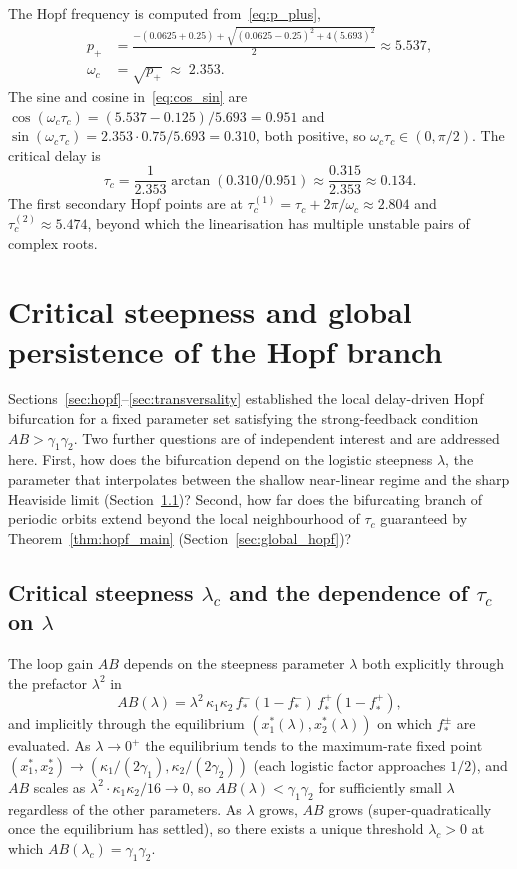 \documentclass[sn-mathphys,Numbered]{sn-jnl}
\theoremstyle{thmstyleone}
\theoremstyle{thmstyletwo}
\theoremstyle{thmstylethree}
\begin{document}
The Hopf frequency is computed from~\eqref{eq:p_plus},
\begin{align*}
p_+ &= \frac{-(0.0625+0.25)+\sqrt{(0.0625-0.25)^2+4(5.693)^2}}{2}
\approx 5.537,\\
\omega_c &= \sqrt{p_+}\;\approx\; 2.353.
\end{align*}
The sine and cosine in~\eqref{eq:cos_sin} are
$\cos(\omega_c\tau_c) = (5.537-0.125)/5.693 = 0.951$ and
$\sin(\omega_c\tau_c) = 2.353\cdot 0.75/5.693 = 0.310$, both positive, so
$\omega_c\tau_c\in(0,\pi/2)$. The critical delay is
\[
\tau_c
= \frac{1}{2.353}\arctan(0.310/0.951)\approx \frac{0.315}{2.353} \approx 0.134.
\]
The first secondary Hopf points are at
$\tau_c^{(1)} = \tau_c+2\pi/\omega_c\approx 2.804$ and
$\tau_c^{(2)}\approx 5.474$, beyond which the linearisation has multiple
unstable pairs of complex roots.

\section{Critical steepness and global persistence of the Hopf branch}
\label{sec:param_global}

Sections~\ref{sec:hopf}--\ref{sec:transversality} established the
local delay-driven Hopf bifurcation for a fixed parameter set
satisfying the strong-feedback condition $AB>\gamma_1\gamma_2$. Two
further questions are of independent interest and are addressed here.
First, how does the bifurcation depend on the logistic steepness
$\lambda$, the parameter that interpolates between the shallow
near-linear regime and the sharp Heaviside limit
(Section~\ref{sec:lambda_critical})? Second, how far does the
bifurcating branch of periodic orbits extend beyond the local
neighbourhood of $\tau_c$ guaranteed by Theorem~\ref{thm:hopf_main}
(Section~\ref{sec:global_hopf})?

\subsection{Critical steepness $\lambda_c$ and the dependence of $\tau_c$ on $\lambda$}
\label{sec:lambda_critical}

The loop gain $AB$ depends on the steepness parameter $\lambda$ both
explicitly through the prefactor $\lambda^2$ in
\[
AB(\lambda) = \lambda^2\,\kappa_1\kappa_2\,
              f^-_*(1-f^-_*)\,f^+_*(1-f^+_*),
\]
and implicitly through the equilibrium $(x_1^*(\lambda),x_2^*(\lambda))$
on which $f^\pm_*$ are evaluated. As $\lambda\to 0^+$ the equilibrium
tends to the maximum-rate fixed point
$(x_1^*,x_2^*)\to(\kappa_1/(2\gamma_1),\kappa_2/(2\gamma_2))$ (each
logistic factor approaches $1/2$), and $AB$ scales as $\lambda^2\cdot
\kappa_1\kappa_2/16\to 0$, so $AB(\lambda)<\gamma_1\gamma_2$ for
sufficiently small $\lambda$ regardless of the other parameters. As
$\lambda$ grows, $AB$ grows (super-quadratically once the equilibrium has
settled), so there exists a unique threshold $\lambda_c>0$ at which
$AB(\lambda_c)=\gamma_1\gamma_2$.
\end{document}
